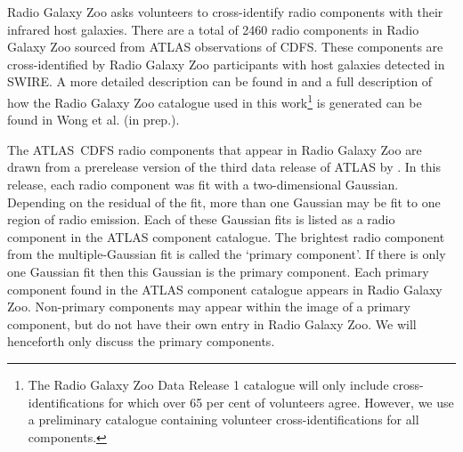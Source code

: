     Radio Galaxy Zoo asks volunteers to cross-identify radio components with
    their infrared host galaxies. There are a total of 2460 radio components
    in Radio Galaxy Zoo sourced from ATLAS {observations of CDFS}. These components are
    cross-identified by Radio Galaxy Zoo participants with host galaxies
    detected in SWIRE. A more detailed description can be found in
    \citet{banfield15} and a full description of how the Radio Galaxy Zoo catalogue used in this work\footnote{The Radio Galaxy Zoo Data
    Release 1 catalogue will only include cross-identifications for which over
    65 per cent of volunteers agree. However, we use a preliminary catalogue containing volunteer
    cross-identifications for all components.} is generated can be found in Wong
    et al. (in prep.).

    The ATLAS~CDFS radio components that appear in Radio Galaxy Zoo {are drawn from a prerelease version of} the third data release
    of ATLAS by \citet{franzen15}. In this release, each radio component was fit with a
    two-dimensional Gaussian. Depending on the residual of the fit, more than
    one Gaussian may be fit to one region of radio emission. Each of these
    Gaussian fits is listed as a radio component in the ATLAS component catalogue. The
    brightest radio component from the multiple-Gaussian fit is called the
    `primary component'. {If there is only one Gaussian fit then this Gaussian is the primary component}. Each primary component found in the ATLAS
    component catalogue appears in Radio Galaxy Zoo. Non-primary components
    may appear within the image of a primary component, but do not have their
    own entry in Radio Galaxy Zoo. We will henceforth only discuss the primary
    components.

